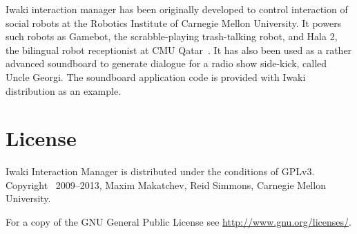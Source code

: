 Iwaki interaction manager has been originally developed to control interaction of social robots at the Robotics Institute of Carnegie Mellon University. It powers such robots as Gamebot, the scrabble-playing trash-talking robot, and Hala 2, the bilingual robot receptionist at CMU Qatar~\citep{Simmons2011}. It has also been used as a rather advanced soundboard to generate dialogue for a radio show side-kick, called Uncle Georgi. The soundboard application code is provided with Iwaki distribution as an example.

\section{License}

Iwaki Interaction Manager is distributed under the conditions of GPLv3. Copyright \textcopyright\ 2009--2013, Maxim Makatchev, Reid Simmons, Carnegie Mellon University. 

For a copy of the GNU General Public License see \url{http://www.gnu.org/licenses/}.